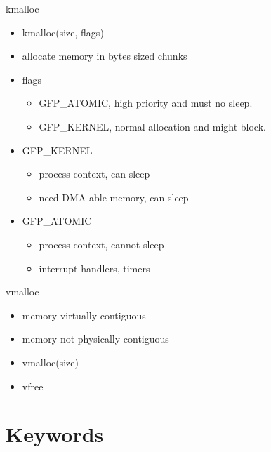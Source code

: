 \documentclass{workshop}
\begin{document}
\begin{frame}{kmalloc}
  \begin{itemize}
    \item kmalloc(size, flags)
    \item allocate memory in bytes sized chunks
     \item flags
    \begin{itemize}
	\item GFP_ATOMIC, high priority and must no sleep.
	\item GFP_KERNEL, normal allocation and might block.
    \end{itemize}
  \item GFP_KERNEL
	\begin{itemize}
	\item process context, can sleep
	\item need DMA-able memory, can sleep
	\end{itemize}
   \item GFP_ATOMIC
	\begin{itemize}
	\item process context, cannot sleep
	\item interrupt handlers, timers
	\end{itemize}
  \end{itemize}
\end{frame}

\begin{frame}{vmalloc}
  \begin{itemize}
  \item memory virtually contiguous
  \item memory not physically contiguous
   \item vmalloc(size)
  \item vfree
  \end{itemize}
\end{frame}



\section{Keywords}
\end{document}
